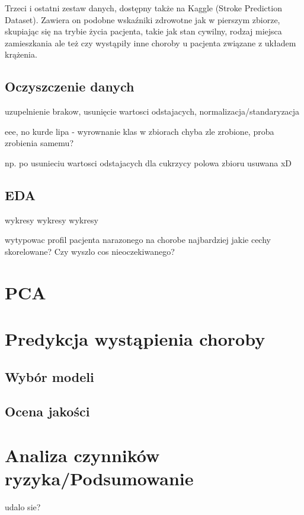 \documentclass[onecolumn,12pt]{article}
\begin{document}
Trzeci i ostatni zestaw danych, dostępny także na Kaggle (Stroke Prediction Dataset). Zawiera on podobne wskaźniki zdrowotne jak w pierszym zbiorze, skupiając się na trybie życia pacjenta, takie jak stan cywilny, rodzaj miejsca zamieszkania ale też czy wystąpiły inne choroby u pacjenta związane z układem krążenia. 

\subsection{Oczyszczenie danych}
uzupelnienie brakow, usunięcie wartosci odstajacych, normalizacja/standaryzacja

eee, no kurde lipa - wyrownanie klas w zbiorach chyba zle zrobione, proba zrobienia samemu?

np. po usunieciu wartosci odstajacych dla cukrzycy polowa zbioru usuwana xD

\subsection{EDA}
wykresy wykresy wykresy

wytypowac profil pacjenta narazonego na chorobe najbardziej
jakie cechy skorelowane? Czy wyszlo cos nieoczekiwanego?


\section{PCA}
\section{Predykcja wystąpienia choroby}
\subsection{Wybór modeli}
\subsection{Ocena jakości}
\section{Analiza czynników ryzyka/Podsumowanie}
udalo sie? 

\begin{thebibliography}{9}
\end{thebibliography}
\end{document}

